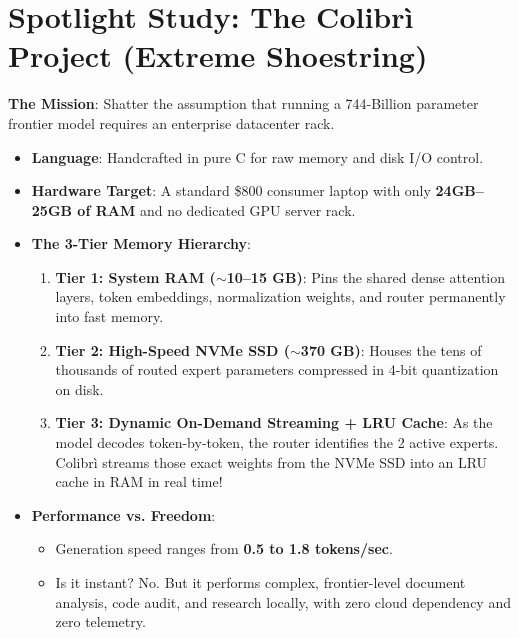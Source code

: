 \documentclass[11pt,a4paper]{article}
\begin{document}
\section{Spotlight Study: The Colibr\`i Project (Extreme Shoestring)}
\begin{colibribox}
    \textbf{The Mission}: Shatter the assumption that running a 744-Billion parameter frontier model requires an enterprise datacenter rack.
    \begin{itemize}
        \item \textbf{Language}: Handcrafted in pure C for raw memory and disk I/O control.
        \item \textbf{Hardware Target}: A standard \$800 consumer laptop with only \textbf{24GB--25GB of RAM} and no dedicated GPU server rack.
        \item \textbf{The 3-Tier Memory Hierarchy}:
        \begin{enumerate}
            \item \textbf{Tier 1: System RAM ($\sim$10--15 GB)}: Pins the shared dense attention layers, token embeddings, normalization weights, and router permanently into fast memory.
            \item \textbf{Tier 2: High-Speed NVMe SSD ($\sim$370 GB)}: Houses the tens of thousands of routed expert parameters compressed in 4-bit quantization on disk.
            \item \textbf{Tier 3: Dynamic On-Demand Streaming + LRU Cache}: As the model decodes token-by-token, the router identifies the 2 active experts. Colibr\`i streams those exact weights from the NVMe SSD into an LRU cache in RAM in real time!
        \end{enumerate}
        \item \textbf{Performance vs. Freedom}:
        \begin{itemize}
            \item Generation speed ranges from \textbf{0.5 to 1.8 tokens/sec}.
            \item Is it instant? No. But it performs complex, frontier-level document analysis, code audit, and research locally, with zero cloud dependency and zero telemetry.
        \end{itemize}
    \end{itemize}
\end{colibribox}

\end{document}
